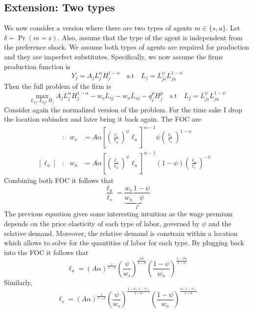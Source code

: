 \documentclass[12pt]{article}
\begin{document}
\subsection{Extension: Two types}
We now consider a version where there are two types of agents $m\in\{s,u\}$. Let $\delta=\Pr\left(m=s\right)$. Also, assume that the type of the agent is independent from the preference shock. We assume both types of agents are required for production and they are imperfect substitutes. Specifically, we now assume the firms production function is 
\begin{equation*}
    Y_j = A_j L_j^\alpha H_j^{1-\alpha}\quad\text{s.t}\quad L_j = L_{js}^\psi L_{ju}^{1-\psi}
\end{equation*}
Then the full problem of the firm is 
\begin{equation*}
    \max_{L_{sj},L_{uj},H_j}  A_j L_j^\alpha H_j^{1-\alpha}-w_sL_{sj}-w_uL_{uj}-q_j^pH_j^p\quad\text{s.t}\quad L_j = L_{js}^\psi L_{ju}^{1-\psi}
\end{equation*}
Consider again the normalized version of the problem. For the time sake I drop the location subindex and later bring it back again. The FOC are 
\begin{align*}
    [\ell_s]&: & w_s&= A\alpha\left[\left(\frac{\ell_s}{\ell_u}\right)^{\psi}\ell_u\right]^{\alpha-1}\psi \left(\frac{\ell_u}{\ell_s}\right)^{1-\psi}  & \\ 
    [\ell_u]&: & w_u&= A\alpha\left[\left(\frac{\ell_s}{\ell_u}\right)^{\psi}\ell_u\right]^{\alpha-1}(1-\psi) \left(\frac{\ell_u}{\ell_s}\right)^{-\psi} &
\end{align*}
Combining both FOC it follows that
\begin{equation*}
    \frac{\ell_u}{\ell_s} = \underbrace{\frac{w_s}{w_u}\frac{1-\psi}{\psi}}_{\Gamma}
\end{equation*}
The previous equation gives some interesting intuition as the wage premium depends on the price elasticity of each type of labor, governed by $\psi$ and the relative demand. Moreover, the relative demand is constrain within a location which allows to solve for the quantities of labor for each type. By plugging back into the FOC it follows that 
\begin{equation*}
    \ell_u = \left(A\alpha\right)^{\frac{1}{1-\alpha}}\left(\frac{\psi}{w_s}\right)^{\frac{\alpha\psi}{1-\alpha}} \left(\frac{1-\psi}{w_u}\right)^{\frac{1-\psi\alpha}{1-\alpha}}
\end{equation*}
Similarly, 
\begin{equation*}
    \ell_s = \left(A\alpha\right)^{\frac{1}{1-\alpha}}\left(\frac{\psi}{w_s}\right)^{\frac{1-\alpha(1-\psi)}{1-\alpha}} \left(\frac{1-\psi}{w_u}\right)^{\frac{\alpha(1-\psi)}{1-\alpha}}
\end{equation*}
\end{document}

